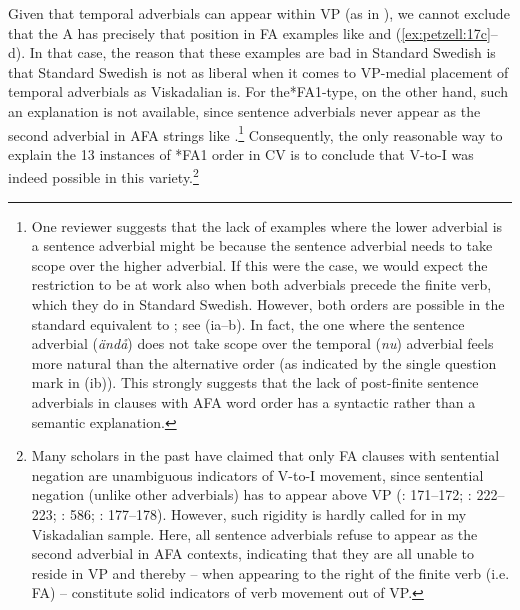 \documentclass[output=paper,colorlinks,citecolor=brown,draft,draftmode]{langscibook}
\begin{document}
Given that temporal adverbials can appear within VP (as in ), we cannot exclude that the A has precisely that position in FA examples like  and (\ref{ex:petzell:17c}–d). In that case, the reason that these examples are bad in Standard Swedish is that Standard Swedish is not as liberal when it comes to VP-medial placement of temporal adverbials as Viskadalian is. For the*FA1-type, on the other hand, such an explanation is not available, since sentence adverbials never appear as the second adverbial in AFA strings like .\footnote{One
    reviewer suggests that the lack of examples where the lower adverbial is a sentence adverbial might be because the sentence adverbial needs to take scope over the higher adverbial. If this were the case, we would expect the restriction to be at work also when both adverbials precede the finite verb, which they do in Standard Swedish. However, both orders are possible in the standard equivalent to ; see (ia–b). In fact, the one where the sentence adverbial (\textit{ändå}) does not take scope over the temporal (\textit{nu}) adverbial feels more natural than the alternative order (as indicated by the single question mark in (ib)). This strongly suggests that the lack of post-finite sentence adverbials in clauses with AFA word order has a syntactic rather than a semantic explanation.
    \ea
    \z
    \z
}
Consequently, the only reasonable way to explain the 13 instances of *FA1 order in CV is to conclude that V-to-I was indeed possible in this variety.\footnote{Many scholars in the past have claimed that only FA clauses with sentential negation are unambiguous indicators of V-to-I movement, since sentential negation (unlike other adverbials) has to appear above VP (\citealt{Falk1993}: 171–172; \citealt{WiklundEtAl2007}: 222–223; \citealt{KoenemanZeijlstra2014}: 586; \citealt{HeycockSundquist2017}: 177–178). However, such rigidity is hardly called for in my Viskadalian sample. Here, all sentence adverbials refuse to appear as the second adverbial in AFA contexts, indicating that they are all unable to reside in VP and thereby – when appearing to the right of the finite verb (i.e. FA) – constitute solid indicators of verb movement out of VP.}
\end{document}
